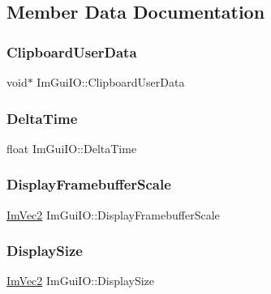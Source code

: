 \subsection{Member Data Documentation}
\hypertarget{struct_im_gui_i_o_a162d9da988e8985df05d262640f2f91c}{}\label{struct_im_gui_i_o_a162d9da988e8985df05d262640f2f91c} 
\subsubsection{\texorpdfstring{Clipboard\+User\+Data}{ClipboardUserData}}
{\footnotesize\ttfamily void$\ast$ Im\+Gui\+I\+O\+::\+Clipboard\+User\+Data}

\hypertarget{struct_im_gui_i_o_a5068d5414a19c2a1bf58029bd732a7c7}{}\label{struct_im_gui_i_o_a5068d5414a19c2a1bf58029bd732a7c7} 
\subsubsection{\texorpdfstring{Delta\+Time}{DeltaTime}}
{\footnotesize\ttfamily float Im\+Gui\+I\+O\+::\+Delta\+Time}

\hypertarget{struct_im_gui_i_o_a703cad6bd4c9e8972d056116104d27e8}{}\label{struct_im_gui_i_o_a703cad6bd4c9e8972d056116104d27e8} 
\subsubsection{\texorpdfstring{Display\+Framebuffer\+Scale}{DisplayFramebufferScale}}
{\footnotesize\ttfamily \hyperlink{struct_im_vec2}{Im\+Vec2} Im\+Gui\+I\+O\+::\+Display\+Framebuffer\+Scale}

\hypertarget{struct_im_gui_i_o_a042cfb90bdc9ccfe37f86b92ade759fd}{}\label{struct_im_gui_i_o_a042cfb90bdc9ccfe37f86b92ade759fd} 
\subsubsection{\texorpdfstring{Display\+Size}{DisplaySize}}
{\footnotesize\ttfamily \hyperlink{struct_im_vec2}{Im\+Vec2} Im\+Gui\+I\+O\+::\+Display\+Size}


